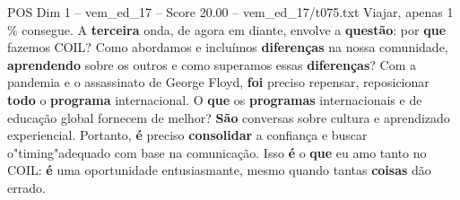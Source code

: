 \begin{textsample}{POS Dim 1 – vem\_ed\_17 – Score 20.00 – vem\_ed\_17/t075.txt}
Viajar, apenas 1 \% consegue.
A \textbf{terceira} onda, de agora em diante, envolve a \textbf{questão}: por \textbf{que} fazemos COIL?
Como abordamos e incluímos \textbf{diferenças} na nossa comunidade, \textbf{aprendendo} sobre os outros e como superamos essas \textbf{diferenças}?
Com a pandemia e o assassinato de George Floyd, \textbf{foi} preciso repensar, reposicionar \textbf{todo} o \textbf{programa} internacional.
O \textbf{que} os \textbf{programas} internacionais e de educação global fornecem de melhor? \textbf{São} conversas sobre cultura e aprendizado experiencial.
Portanto, \textbf{é} preciso \textbf{consolidar} a confiança e buscar o"timing"adequado com base na comunicação.
Isso \textbf{é} o \textbf{que} eu amo tanto no COIL: \textbf{é} uma oportunidade entusiasmante, mesmo quando tantas \textbf{coisas} dão errado.

\end{textsample}

